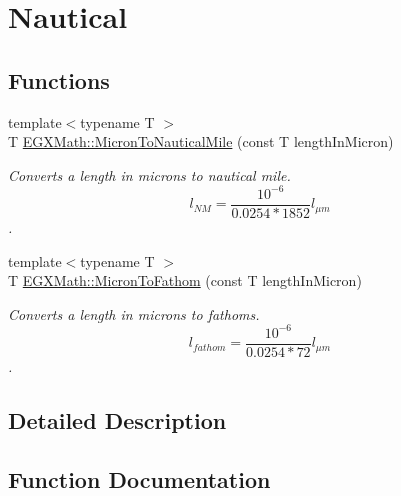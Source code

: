 \hypertarget{group___e_g_x_math-_conversions-_length_conversions-_non-_s_i-_micron-_nautical}{}\section{Nautical}
\label{group___e_g_x_math-_conversions-_length_conversions-_non-_s_i-_micron-_nautical}
\subsection*{Functions}
\begin{DoxyCompactItemize}
\item 
{\footnotesize template$<$typename T $>$ }\\T \mbox{\hyperlink{group___e_g_x_math-_conversions-_length_conversions-_non-_s_i-_micron-_nautical_gaa3944ed4bca9dcd37c3043d44cc36bf1}{E\+G\+X\+Math\+::\+Micron\+To\+Nautical\+Mile}} (const T length\+In\+Micron)
\begin{DoxyCompactList}\small\item\em Converts a length in microns to nautical mile. \[ l_{NM}= \frac{10^{-6}}{0.0254 * 1852} l_{\mu m} \]. \end{DoxyCompactList}\item 
{\footnotesize template$<$typename T $>$ }\\T \mbox{\hyperlink{group___e_g_x_math-_conversions-_length_conversions-_non-_s_i-_micron-_nautical_ga5cb74ac25926c826943b859a582a5e6a}{E\+G\+X\+Math\+::\+Micron\+To\+Fathom}} (const T length\+In\+Micron)
\begin{DoxyCompactList}\small\item\em Converts a length in microns to fathoms. \[ l_{fathom}= \frac{10^{-6}}{0.0254 * 72} l_{\mu m} \]. \end{DoxyCompactList}\end{DoxyCompactItemize}


\subsection{Detailed Description}


\subsection{Function Documentation}
\mbox{\label{group___e_g_x_math-_conversions-_length_conversions-_non-_s_i-_micron-_nautical_ga5cb74ac25926c826943b859a582a5e6a}} 
